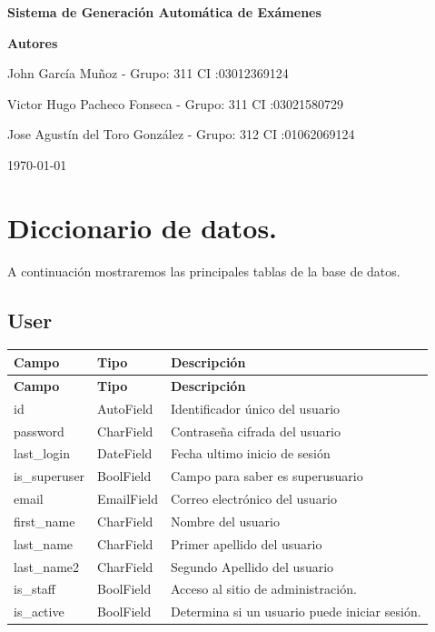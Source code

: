 \documentclass[a4paper,12pt]{article}
\begin{document}
\begin{titlepage}
    \centering
    \vspace{1in}
    {\Huge \bfseries Sistema de Generación Automática de Exámenes \par}
    \vspace{1.5in}
    \centering
    \vspace{1in}
    {\Huge \bfseries Autores \par}
    {\Large John García Muñoz - Grupo: 311 CI :03012369124  \par}
    {\Large Victor Hugo Pacheco Fonseca - Grupo: 311 CI :03021580729 \par}
    {\Large Jose Agustín del Toro González - Grupo: 312 CI :01062069124 \par}
    \vfill
    {\Large \today \par}
\end{titlepage}

\tableofcontents
\newpage





\section{Diccionario de datos.}
A continuación mostraremos las principales tablas de la base de datos.

\subsection{User}

\begin{longtable}{| p{3cm} | p{3cm}|p{10cm}|}
	\hline
	\textbf{Campo} & \textbf{Tipo} & \textbf{Descripción} \\
	\hline
	\endfirsthead
	\hline
	\textbf{Campo} & \textbf{Tipo} & \textbf{Descripción} \\
	\hline
	\endhead
	\hline
	\endfoot
	\hline
	\endlastfoot
	
	id & AutoField & Identificador único del usuario \\
	\hline
	password & CharField & Contraseña cifrada del usuario \\
	\hline
	last\_login & DateField & Fecha ultimo inicio de sesión \\
	\hline
	is\_superuser & BoolField & Campo para saber es superusuario \\
	\hline
	email & EmailField & Correo electrónico del usuario \\
	\hline
	first\_name & CharField & Nombre del usuario \\
	\hline
	last\_name & CharField & Primer apellido del usuario \\
	\hline
	last\_name2 & CharField & Segundo Apellido del usuario \\
	\hline
	is\_staff & BoolField &  Acceso al sitio de administración.\\
	\hline
	is\_active & BoolField & Determina si un usuario puede iniciar sesión.\\
	
	\hline
\end{longtable}
\end{document}
